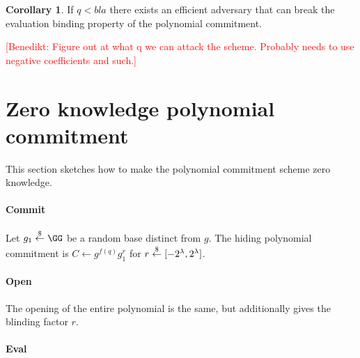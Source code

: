 \documentclass{article}
\theoremstyle{definition}
\newtheorem{corollary}{Corollary}
\newcommand{\benedikt}[1]{{\textcolor{red}{[Benedikt: #1]}}}
\newcommand{\benedikt}[1]{}
\begin{document}
\begin{corollary}
	If $q<bla$ there exists an efficient adversary that can break the evaluation binding property of the polynomial commitment.
\end{corollary}
\benedikt{Figure out at what q we can attack the scheme. Probably needs to use negative coefficients and such.}

\section{Zero knowledge polynomial commitment} 
This section sketches how to make the polynomial commitment scheme zero knowledge. 

\paragraph{Commit} Let $g_1 \sample \GG$ be a random base distinct from $g$. 
The hiding polynomial commitment is $C \leftarrow g^{f(q)}g_1^r$ for $r \overset{\$}{\gets} [-2^\lambda, 2^\lambda]$. 

\paragraph{Open} The opening of the entire polynomial is the same, but additionally gives the blinding factor $r$. 

\paragraph{Eval}
\end{document}

